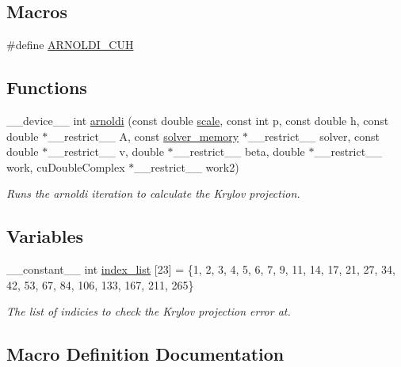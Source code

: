\subsection*{Macros}
\begin{DoxyCompactItemize}
\item 
\#define \hyperlink{arnoldi_8cuh_abeda2f8ea38aa8f4d7bd240e22181d1c}{A\+R\+N\+O\+L\+D\+I\+\_\+\+C\+UH}
\end{DoxyCompactItemize}
\subsection*{Functions}
\begin{DoxyCompactItemize}
\item 
\+\_\+\+\_\+device\+\_\+\+\_\+ int \hyperlink{arnoldi_8cuh_ab3811b1c15ea17c96f86d55e137e4374}{arnoldi} (const double \hyperlink{radau2a_8cu_a4fab5866449108992478041d2e51a28c}{scale}, const int p, const double h, const double $\ast$\+\_\+\+\_\+restrict\+\_\+\+\_\+ A, const \hyperlink{structsolver__memory}{solver\+\_\+memory} $\ast$\+\_\+\+\_\+restrict\+\_\+\+\_\+ solver, const double $\ast$\+\_\+\+\_\+restrict\+\_\+\+\_\+ v, double $\ast$\+\_\+\+\_\+restrict\+\_\+\+\_\+ beta, double $\ast$\+\_\+\+\_\+restrict\+\_\+\+\_\+ work, cu\+Double\+Complex $\ast$\+\_\+\+\_\+restrict\+\_\+\+\_\+ work2)
\begin{DoxyCompactList}\small\item\em Runs the arnoldi iteration to calculate the Krylov projection. \end{DoxyCompactList}\end{DoxyCompactItemize}
\subsection*{Variables}
\begin{DoxyCompactItemize}
\item 
\+\_\+\+\_\+constant\+\_\+\+\_\+ int \hyperlink{arnoldi_8cuh_a3e638b2302ac9e7f341e07f7eb51ec5d}{index\+\_\+list} \mbox{[}23\mbox{]} = \{1, 2, 3, 4, 5, 6, 7, 9, 11, 14, 17, 21, 27, 34, 42, 53, 67, 84, 106, 133, 167, 211, 265\}
\begin{DoxyCompactList}\small\item\em The list of indicies to check the Krylov projection error at. \end{DoxyCompactList}\end{DoxyCompactItemize}


\subsection{Macro Definition Documentation}
